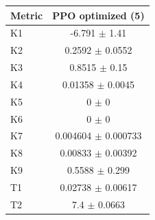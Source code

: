 \begin{tabular}{lc}
\toprule
Metric & PPO optimized (5) \\
\midrule
K1 & -6.791 $\pm$ 1.41 \\
K2 & 0.2592 $\pm$ 0.0552 \\
K3 & 0.8515 $\pm$ 0.15 \\
K4 & 0.01358 $\pm$ 0.0045 \\
K5 & 0 $\pm$ 0 \\
K6 & 0 $\pm$ 0 \\
K7 & 0.004604 $\pm$ 0.000733 \\
K8 & 0.00833 $\pm$ 0.00392 \\
K9 & 0.5588 $\pm$ 0.299 \\
T1 & 0.02738 $\pm$ 0.00617 \\
T2 & 7.4 $\pm$ 0.0663 \\
\bottomrule
\end{tabular}
